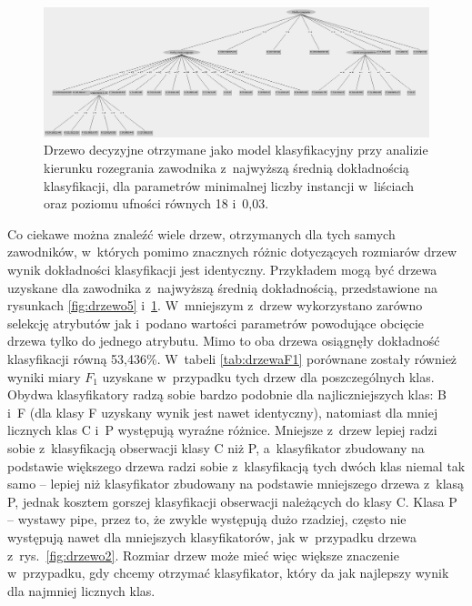 \documentclass[a4paper,twoside,12pt]{book}
\begin{document}
\begin{figure}
\centering
\includegraphics[width=\columnwidth]{drzewoDuze}
\caption{Drzewo decyzyjne otrzymane jako model klasyfikacyjny przy analizie kierunku rozegrania zawodnika z~najwyższą średnią dokładnością klasyfikacji, dla parametrów minimalnej liczby instancji w~liściach oraz poziomu ufności równych 18 i~0,03.}
\label{fig:drzewo6}
\end{figure}

Co ciekawe można znaleźć wiele drzew, otrzymanych dla tych samych zawodników, w~których pomimo znacznych różnic dotyczących rozmiarów drzew wynik dokładności klasyfikacji jest identyczny. Przykładem mogą być drzewa uzyskane dla zawodnika z~najwyższą średnią dokładnością, przedstawione na rysunkach \ref{fig:drzewo5} i~\ref{fig:drzewo6}. W~mniejszym z~drzew wykorzystano zarówno selekcję atrybutów jak i~podano wartości parametrów powodujące obcięcie drzewa tylko do jednego atrybutu. Mimo to oba drzewa osiągnęły dokładność klasyfikacji równą 53,436\%. W~tabeli \ref{tab:drzewaF1} porównane zostały również wyniki miary $F_1$ uzyskane w~przypadku tych drzew dla poszczególnych klas. Obydwa klasyfikatory radzą sobie bardzo podobnie dla najliczniejszych klas: B i~F (dla klasy F uzyskany wynik jest nawet identyczny), natomiast dla mniej licznych klas C i~P występują wyraźne różnice. Mniejsze z~drzew lepiej radzi sobie z~klasyfikacją obserwacji klasy C niż P, a~klasyfikator zbudowany na podstawie większego drzewa radzi sobie z~klasyfikacją tych dwóch klas niemal tak samo -- lepiej niż klasyfikator zbudowany na podstawie mniejszego drzewa z~klasą P, jednak kosztem gorszej klasyfikacji obserwacji należących do klasy C. Klasa P -- wystawy pipe, przez to, że zwykle występują dużo rzadziej, często  nie występują nawet dla mniejszych klasyfikatorów, jak w~przypadku drzewa z~rys.~\ref{fig:drzewo2}. Rozmiar drzew może mieć więc większe znaczenie w~przypadku, gdy chcemy otrzymać klasyfikator, który da jak najlepszy wynik dla najmniej licznych klas.
\end{document}
